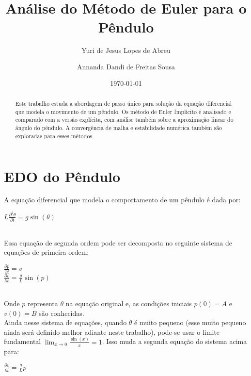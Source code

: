 \documentclass{amsart}
\theoremstyle{definition}
\theoremstyle{remark}
\numberwithin{equation}{section}
\begin{document}
\title{Análise do Método de Euler para o Pêndulo}

\author{Yuri de Jesus Lopes de Abreu}

\author{Annanda Dandi de Freitas Sousa}

\date{\today}


\begin{abstract}
Este trabalho estuda a abordagem de passo único para solução da equação diferencial que modela o movimento de um pêndulo. Os método de Euler Implícito é analisado e comparado com a versão explícita, com análise também sobre a aproximação linear do ângulo do pêndulo.
A convergência de malha e estabilidade numérica também são exploradas para esses métodos.
\end{abstract}
\maketitle

\section{EDO do Pêndulo}
A equação diferencial que modela o comportamento de um pêndulo é dada por:\\

\begin{flushleft}
$L \frac{\partial^2 \theta}{\partial t} = g \sin(\theta)$ \\
\end{flushleft} \ \\

Essa equação de segunda ordem pode ser decomposta no seguinte sistema de equações de primeira ordem:\\

\begin{flushleft}
$\frac{\partial p}{\partial t} = v$ \\
$\frac{\partial v}{\partial t} = \frac{g}{L}\sin(p)$\\
\end{flushleft} \ \\

Onde $p$ representa $\theta$ na equação original e, as condições iniciais $p(0)=A$ e $v(0)=B$ são conhecidas. \\

Ainda nesse sistema de equações, quando $\theta$ é muito pequeno (esse muito pequeno ainda será definido melhor adiante neste trabalho), pode-se usar o limite fundamental $\lim_{x \to 0} \frac{\sin(x)}{x}=1$. Isso muda a segunda equação do sistema acima para:\\
\begin{flushleft}
$\frac{\partial v}{\partial t} = \frac{g}{L}p$ \\
\end{flushleft} \ \\
\end{document}
